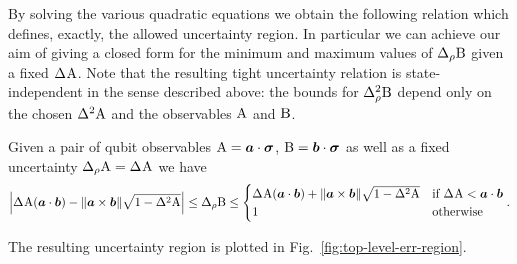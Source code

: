 By solving the various quadratic equations  we obtain the following relation which defines, exactly, the allowed uncertainty region. In particular we can achieve our aim of giving a closed form for the minimum and maximum values of $\sdevr{\opb}$  given a fixed $\sdev{\opa}$. Note that the resulting tight uncertainty relation is state-independent in the sense described above: the bounds for $\varr{\opb}$ depend only on the chosen $\var{\opa}$ and the observables $\operatorname{A}$ and $\operatorname{B}$.
\begin{thm}\label{thm:ab-pur}
  Given a pair of qubit observables  $\operatorname{A}=\bm{a}\cdot{\boldsymbol\sigma}$, $\operatorname{B}=\bm{b}\cdot{\boldsymbol\sigma}$ as well as a fixed uncertainty $\sdevr{\opa}=\sdev{\opa}$ we have
  \begin{align}%
    \left|\sdev{\opa} (\boa\cdot\bob) - \|\boa\times\bob\|\sqrt{1-\var \opa}\right|
    \leq \sdevr{\opb} %
                            \leq\begin{cases}
                              \sdev{\opa} (\boa\cdot\bob) + \|\boa\times\bob\|\sqrt{1-\var \opa} & \text{\normalfont if } \sdev{\opa} < \boa\cdot\bob\\
                              1 & \text{\normalfont otherwise}
                            \end{cases}.%
  \end{align}
\end{thm}
The resulting uncertainty region is plotted in Fig.~\ref{fig:top-level-err-region}.


